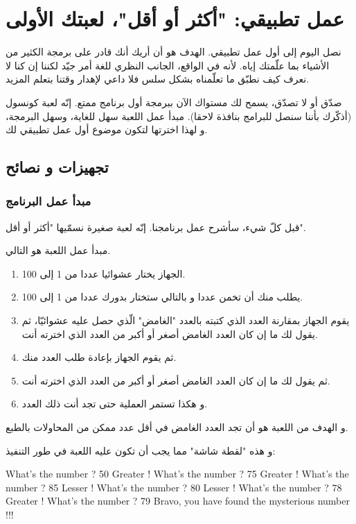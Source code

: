 \chapter{عمل تطبيقي: "أكثر أو أقل"، لعبتك الأولى}

نصل اليوم إلى أول عمل تطبيقي. الهدف هو أن أريك أنك قادر على برمجة الكثير من الأشياء بما علّمتك إياه. لأنه في الواقع، الجانب النظري للغة أمر جيّد لكننا إن كنا لا نعرف كيف نطبّق ما تعلّمناه بشكل سلس فلا داعي لإهدار وقتنا بتعلم المزيد.

صدّق أو لا تصدّق، يسمح لك مستواك الآن ببرمجة أول برنامج ممتع. إنّه لعبة كونسول (أذكّرك بأننا سنصل للبرامج بنافذة لاحقا). مبدأ عمل اللعبة سهل للغاية، وسهل البرمجة، و لهذا اخترتها لتكون موضوع أول عمل تطبيقي لك.

\section{تجهيزات و نصائح}

\subsection{مبدأ عمل البرنامج}

قبل كلّ شيء، سأشرح عمل برنامجنا. إنّه لعبة صغيرة نسمّيها "أكثر أو أقل".

مبدأ عمل اللعبة  هو التالي.

\begin{enumerate}
	\item الجهاز يختار عشوائيا عددا من 1 إلى 100.
	\item يطلب منك أن تخمن عددا و بالتالي ستختار بدورك عددا من 1 إلى 100.
	\item يقوم الجهاز بمقارنة العدد الذي كتبته بالعدد "الغامض" الّذي حصل عليه عشوائيّا، ثم يقول لك ما إن كان العدد الغامض أصغر أو أكبر من العدد الذي اخترته أنت.
	\item ثم يقوم الجهاز بإعادة طلب العدد منك.
	\item ثم يقول لك ما إن كان العدد الغامض أصغر أو أكبر من العدد الذي اخترته أنت.
	\item و هكذا تستمر العملية حتى تجد أنت ذلك العدد.
\end{enumerate}
و الهدف من اللعبة هو أن تجد العدد الغامض في أقل عدد ممكن من المحاولات بالطبع.

و هذه "لقطة شاشة" مما يجب أن تكون عليه اللعبة في طور التنفيذ:

\begin{Console}
What's the number ? 50
Greater !
What's the number ? 75
Greater  !
What's the number ? 85
Lesser !
What's the number ? 80
Lesser !
What's the number ? 78
Greater !
What's the number ? 79
Bravo, you have found the mysterious number !!!
\end{Console}

